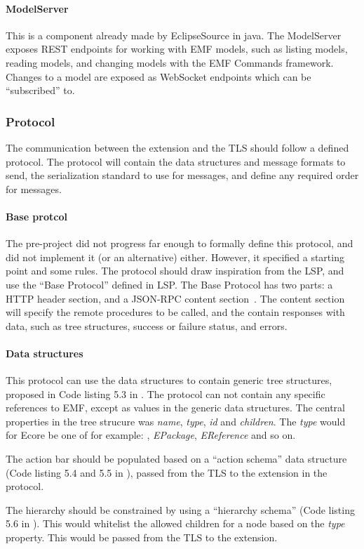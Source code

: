 \paragraph{ModelServer}
This is a component already made by EclipseSource in java.
The ModelServer exposes \gls{REST} endpoints for working with \acrshort{EMF} models, such as listing models, reading models, and changing models with the EMF Commands framework.
Changes to a model are exposed as \gls{WebSocket} endpoints which can be ``subscribed'' to.


\subsubsection{Protocol}
The communication between the extension and the TLS should follow a defined protocol.
The protocol will contain the data structures and message formats to send, the serialization standard to use for messages, and define any required order for messages.


\paragraph{Base protcol}
The pre-project did not progress far enough to formally define this protocol, and did not implement it (or an alternative) either.
However, it specified a starting point and some rules.
The protocol should draw inspiration from the \acrlong{LSP}, and use the ``Base Protocol'' defined in \acrshort{LSP}.
The Base Protocol has two parts: a HTTP header section, and a \gls{JSON-RPC} content section~\cite[p.~17,18]{rekstadModelingEnvironmentCloud2020}.
The content section will specify the remote procedures to be called, and the contain responses with data, such as tree structures, success or failure status, and errors.


\paragraph{Data structures}
This protocol can use the data structures to contain generic tree structures, proposed in Code listing 5.3 in \cite[p.~43,44]{rekstadModelingEnvironmentCloud2020}. %
The protocol can not contain any specific references to \acrshort{EMF}, except as values in the generic data structures.
The central properties in the tree strucure was \textit{name}, \textit{type}, \textit{id} and \textit{children}.
The \textit{type} would for \gls{Ecore} be one of for example: , \textit{EPackage}, \textit{EReference} and so on.


The action bar should be populated based on a ``action schema'' data structure (Code listing 5.4 and 5.5 in \cite[p.~45]{rekstadModelingEnvironmentCloud2020}), passed from the TLS to the extension in the protocol.


The hierarchy should be constrained by using a ``hierarchy schema'' (Code listing 5.6 in \cite[p.~45]{rekstadModelingEnvironmentCloud2020}).
This would whitelist the allowed children for a node based on the \textit{type} property.
This would be passed from the TLS to the extension.
